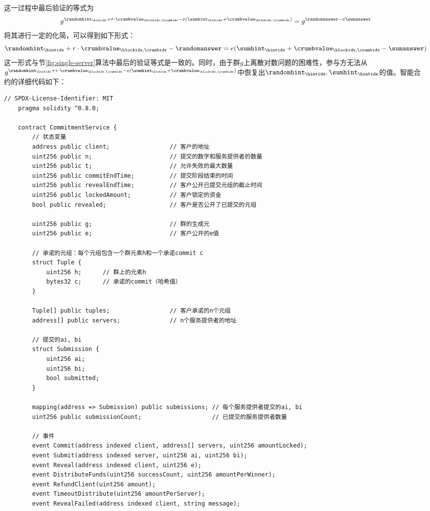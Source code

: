 这一过程中最后验证的等式为$$g^{\randomhint_\hintidx+r\cdot \crumbvalue_{\blockidx, \crumbidx}-e(\sumhint_\hintidx+\crumbvalue_{\blockidx, \crumbidx})}=g^{\randomanswer-e\sumanswer}$$
将其进行一定的化简，可以得到如下形式：
$$\randomhint_\hintidx+r\cdot \crumbvalue_{\blockidx, \crumbidx}-\randomanswer=e(\sumhint_\hintidx+\crumbvalue_{\blockidx, \crumbidx}-\sumanswer)$$
这一形式与节\ref{fig:single-server}算法中最后的验证等式是一致的。同时，由于群$g$上离散对数问题的困难性，参与方无法从$g^{\randomhint_\hintidx+r\cdot \crumbvalue_{\blockidx, \crumbidx}-e(\sumhint_\hintidx+\crumbvalue_{\blockidx, \crumbidx})}$中恢复出$\randomhint_\hintidx,\sumhint_\hintidx$的值。智能合约的详细代码如下：
\begin{lstlisting}[language=Solidity]
    // SPDX-License-Identifier: MIT
    pragma solidity ^0.8.0;
    
    contract CommitmentService {
        // 状态变量
        address public client;                 // 客户的地址
        uint256 public n;                      // 提交的数字和服务提供者的数量
        uint256 public t;                      // 允许失败的最大数量
        uint256 public commitEndTime;          // 提交阶段结束的时间
        uint256 public revealEndTime;          // 客户公开已提交元组的截止时间
        uint256 public lockedAmount;           // 客户锁定的资金
        bool public revealed;                  // 客户是否公开了已提交的元组
    
        uint256 public g;                      // 群的生成元
        uint256 public e;                      // 客户公开的e值
    
        // 承诺的元组：每个元组包含一个群元素h和一个承诺commit c
        struct Tuple {
            uint256 h;      // 群上的元素h
            bytes32 c;      // 承诺的commit（哈希值）
        }
    
        Tuple[] public tuples;                 // 客户承诺的n个元组
        address[] public servers;              // n个服务提供者的地址
    
        // 提交的ai, bi
        struct Submission {
            uint256 ai;
            uint256 bi;
            bool submitted;
        }
    
        mapping(address => Submission) public submissions; // 每个服务提供者提交的ai, bi
        uint256 public submissionCount;                    // 已提交的服务提供者数量
    
        // 事件
        event Commit(address indexed client, address[] servers, uint256 amountLocked);
        event Submit(address indexed server, uint256 ai, uint256 bi);
        event Reveal(address indexed client, uint256 e);
        event DistributeFunds(uint256 successCount, uint256 amountPerWinner);
        event RefundClient(uint256 amount);
        event TimeoutDistribute(uint256 amountPerServer);
        event RevealFailed(address indexed client, string message);
    

\end{lstlisting}
